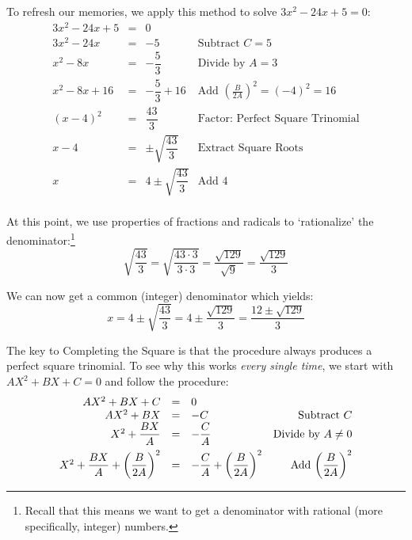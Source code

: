 \documentclass[10pt]{article}
\begin{document}
\medskip

To refresh our memories, we apply this method to solve $3x^2 - 24x + 5 = 0$: \[ \begin{array}{rclr}

3x^2 - 24x + 5 & = & 0 & \\

3x^2 - 24x  & = & -5 & \text{Subtract  $C=5$} \\

x^2 - 8x & = & -\dfrac{5}{3} & \text{Divide by $A = 3$} \\ [8pt]

x^2 - 8x + 16 & = & -\dfrac{5}{3} + 16 & \text{Add $\left(\frac{B}{2A}\right)^2 = (-4)^2 = 16$} \\ [8pt]

(x - 4)^2 & = & \dfrac{43}{3} & \text{Factor: Perfect Square Trinomial} \\
x - 4 & = & \pm \sqrt{\dfrac{43}{3}} & \text{Extract Square Roots} \\ [5pt]

x & = & 4 \pm \sqrt{\dfrac{43}{3}} & \text{Add $4$} \\

\end{array}\]

At this point, we use properties of fractions and radicals to `rationalize' the denominator:\footnote{Recall that this means we want to get a denominator with rational (more specifically, integer) numbers.}  \[ \sqrt{\dfrac{43}{3}} = \sqrt{\dfrac{43 \cdot 3}{3 \cdot 3}} = \dfrac{\sqrt{129}}{\sqrt{9}} = \dfrac{\sqrt{129}}{3} \]

We can now get a common (integer) denominator which yields: \[x=  4 \pm \sqrt{\dfrac{43}{3}} = 4 \pm \dfrac{\sqrt{129}}{3} = \dfrac{12 \pm \sqrt{129}}{3} \]

The key to Completing the Square is that the procedure always produces a perfect square trinomial. To see why this works \textit{every single time}, we start with $AX^2 + BX + C = 0$ and follow the procedure:\[ \begin{array}{rclr}

AX^2 + BX + C & = & 0 & \\

AX^2 + BX & = & -C & \text{Subtract $C$} \\

X^2 + \dfrac{BX}{A} & = & -\dfrac{C}{A} & \text{Divide by $A \neq 0$} \\ [8pt]

X^2 + \dfrac{BX}{A} + \left(\dfrac{B}{2A}\right)^2 & = & -\dfrac{C}{A} + \left(\dfrac{B}{2A}\right)^2 & \text{Add $ \left(\dfrac{B}{2A}\right)^2$} \\

\end{array} \]
\end{document}
